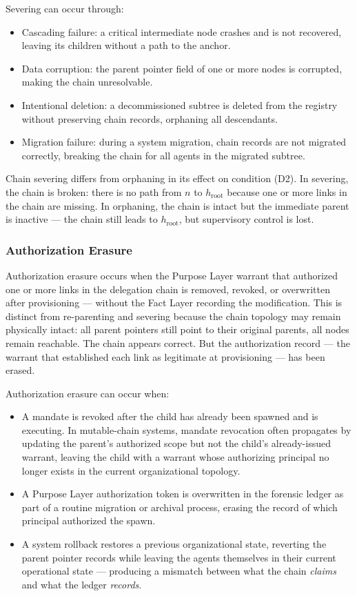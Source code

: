 Severing can occur through:
\begin{itemize}
    \item Cascading failure: a critical intermediate node crashes and is not recovered, leaving its children without a path to the anchor.
    \item Data corruption: the parent pointer field of one or more nodes is corrupted, making the chain unresolvable.
    \item Intentional deletion: a decommissioned subtree is deleted from the registry without preserving chain records, orphaning all descendants.
    \item Migration failure: during a system migration, chain records are not migrated correctly, breaking the chain for all agents in the migrated subtree.
\end{itemize}

Chain severing differs from orphaning in its effect on condition (D2). In severing, the chain is broken: there is no path from $n$ to $h_{\text{root}}$ because one or more links in the chain are missing. In orphaning, the chain is intact but the immediate parent is inactive — the chain still leads to $h_{\text{root}}$, but supervisory control is lost.

\subsubsection{Authorization Erasure}
\label{sec:authorization-erasure}

Authorization erasure occurs when the Purpose Layer warrant that authorized one or more links in the delegation chain is removed, revoked, or overwritten after provisioning — without the Fact Layer recording the modification. This is distinct from re-parenting and severing because the chain topology may remain physically intact: all parent pointers still point to their original parents, all nodes remain reachable. The chain appears correct. But the authorization record — the warrant that established each link as legitimate at provisioning — has been erased.

Authorization erasure can occur when:
\begin{itemize}
    \item A mandate is revoked after the child has already been spawned and is executing. In mutable-chain systems, mandate revocation often propagates by updating the parent's authorized scope but not the child's already-issued warrant, leaving the child with a warrant whose authorizing principal no longer exists in the current organizational topology.
    \item A Purpose Layer authorization token is overwritten in the forensic ledger as part of a routine migration or archival process, erasing the record of which principal authorized the spawn.
    \item A system rollback restores a previous organizational state, reverting the parent pointer records while leaving the agents themselves in their current operational state — producing a mismatch between what the chain \emph{claims} and what the ledger \emph{records}.
\end{itemize}


